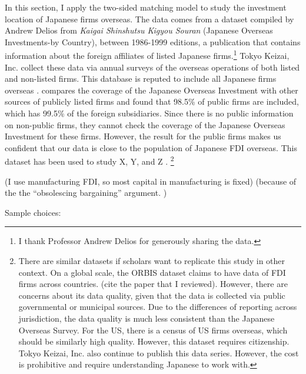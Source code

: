 In this section, I apply the two-sided matching model to study the investment
location of Japanese firms overseas. The data comes from a dataset compiled by
Andrew Delios from \textit{Kaigai Shinshutsu Kigyou Souran} (Japanese Overseas
Investments-by Country), between 1986-1999 editions, a publication that contains
information about the foreign affiliates of listed Japanese firms.\footnote{I
thank Professor Andrew Delios for generously sharing the data.} Tokyo Keizai,
Inc. collect these data via annual surveys of the overseas operations of both
listed and non-listed firms. This database is reputed to include all Japanese
firms overseas \citep{Yamawaki1991}. \citep{Delios2001} compares the coverage of
the Japanese Overseas Investment with other sources of publicly listed firms and
found that 98.5\% of public firms are included, which has 99.5\% of the foreign
subsidiaries. Since there is no public information on non-public firms, they
cannot check the coverage of the Japanese Overseas Investment for these firms.
However, the result for the public firms makes us confident that our data is
close to the population of Japanese FDI overseas. This dataset has been used to
study X, Y, and Z \citep{Delios2000}. \footnote{There are similar datasets if
scholars want to replicate this study in other context. On a global scale, the
ORBIS dataset claims to have data of FDI firms across countries. (cite the paper
that I reviewed). However, there are concerns about its data quality, given that
the data is collected via public governmental or municipal sources. Due to the
differences of reporting across jurisdiction, the data quality is much less
consistent than the Japanese Overseas Survey. For the US, there is a census of
US firms overseas, which should be similarly high quality. However, this dataset
requires citizenship. Tokyo Keizai, Inc. also continue to publish this data
series. However, the cost is prohibitive and require understanding Japanese to
work with.}


(I use manufacturing FDI, so most capital in manufacturing is fixed) (because of
the the ``obsolescing bargaining'' argument. )



Sample choices:

